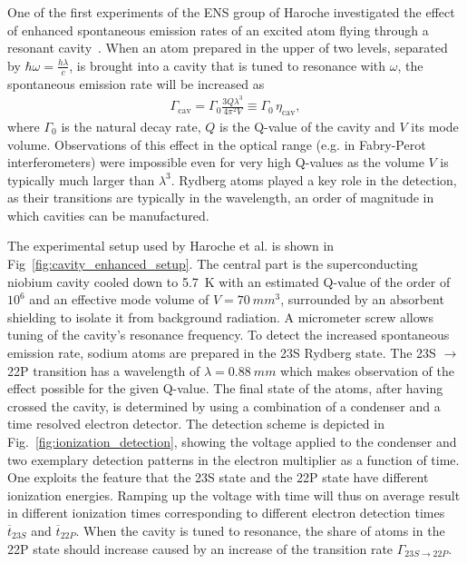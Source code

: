 One of the first experiments of the ENS group of Haroche investigated the effect
of enhanced spontaneous emission rates of an excited atom flying through a
resonant cavity~\cite{haroche1983EnhancedSpontEm}. When an atom prepared in
the upper of two levels, separated by $\hbar \omega=\frac{h\lambda}{c}$, is brought into a cavity
that is tuned to resonance with $\omega$, the spontaneous emission rate will
be increased as
\begin{align}
  \label{eq:enh_spont_em_rate}
  \Gamma_{\text{cav}} = \Gamma_0 \frac{3Q\lambda^3}{4\pi^2 V} \equiv
  \Gamma_0\,\eta_{\text{cav}},
\end{align}
where $\Gamma_0$ is the natural decay rate, $Q$ is the Q-value of the cavity and
$V$ its mode volume. Observations of this effect in the optical range (e.g. in
Fabry-Perot interferometers) were impossible even for very high Q-values as the
volume $V$ is typically much larger than $\lambda^3$. Rydberg atoms played a key
role in the detection, as their transitions are typically in the 
wavelength, an order of magnitude in which cavities can be manufactured.

The experimental setup used by Haroche et al. is shown in
Fig~\ref{fig:cavity_enhanced_setup}. The central part is the superconducting
niobium cavity cooled down to \SI{5.7}{K} with an estimated Q-value of the order
of $10^6$ and an effective mode volume of $V=\SI{70}{mm^3}$, surrounded by an absorbent
shielding to isolate it from background radiation. A micrometer screw allows
tuning of the cavity's resonance frequency. To detect the increased spontaneous
emission rate, sodium atoms are prepared in the 23S Rydberg state. The
23S $\rightarrow$ 22P transition has a wavelength of $\lambda=\SI{0.88}{mm}$
which makes observation of the effect possible for the given Q-value. The final
state of the atoms, after having crossed the cavity, is determined by using a
combination of a condenser and a time resolved electron detector. The detection
scheme is depicted in Fig.~\ref{fig:ionization_detection}, showing the voltage
applied to the condenser and two exemplary detection patterns in the electron
multiplier as a function of time. One exploits the feature that the 23S state
and the 22P state have different ionization energies. Ramping up the voltage
with time will thus on average result in different ionization times
corresponding to different electron detection times $\overline{t}_{23S}$ and
$\overline{t}_{22P}$. When the cavity is tuned to resonance, the share of atoms
in the 22P state should increase caused by an increase of the transition rate
$\Gamma_{23S \rightarrow 22P}$.

